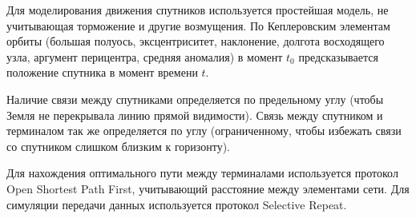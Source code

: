 Для моделирования движения спутников используется простейшая модель, не учитывающая торможение и другие возмущения. По Кеплеровским элементам орбиты (большая полуось, эксцентриситет, наклонение, долгота восходящего узла, аргумент перицентра, средняя аномалия) в момент $t_0$ предсказывается положение спутника в момент времени $t$.

Наличие связи между спутниками определяется по предельному углу (чтобы Земля не перекрывала линию прямой видимости). Связь между спутником и терминалом так же определяется по углу (ограниченному, чтобы избежать связи со спутником слишком близким к горизонту).

Для нахождения оптимального пути между терминалами используется протокол Open Shortest Path First, учитывающий расстояние между элементами сети. Для симуляции передачи данных используется протокол Selective Repeat. 

